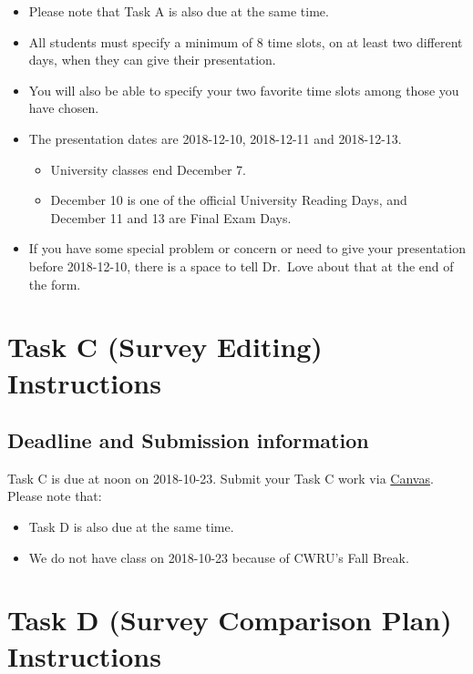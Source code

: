 \documentclass[]{book}
\providecommand{\tightlist}{%
  \setlength{\itemsep}{0pt}\setlength{\parskip}{0pt}}
\theoremstyle{definition}
\theoremstyle{definition}
\theoremstyle{definition}
\theoremstyle{remark}
\begin{document}
\begin{itemize}
\item
  Please note that Task A is also due at the same time.
\item
  All students must specify a minimum of 8 time slots, on at least two
  different days, when they can give their presentation.
\item
  You will also be able to specify your two favorite time slots among
  those you have chosen.
\item
  The presentation dates are 2018-12-10, 2018-12-11 and 2018-12-13.

  \begin{itemize}
  \tightlist
  \item
    University classes end December 7.
  \item
    December 10 is one of the official University Reading Days, and
    December 11 and 13 are Final Exam Days.
  \end{itemize}
\item
  If you have some special problem or concern or need to give your
  presentation before 2018-12-10, there is a space to tell Dr.~Love
  about that at the end of the form.
\end{itemize}

\hypertarget{taskC}{%
\chapter{Task C (Survey Editing) Instructions}\label{taskC}}

\hypertarget{deadline-and-submission-information-2}{%
\section{Deadline and Submission
information}\label{deadline-and-submission-information-2}}

Task C is due at noon on 2018-10-23. Submit your Task C work via
\href{https://canvas.case.edu/}{Canvas}. Please note that:

\begin{itemize}
\tightlist
\item
  Task D is also due at the same time.
\item
  We do not have class on 2018-10-23 because of CWRU's Fall Break.
\end{itemize}

\hypertarget{taskD}{%
\chapter{Task D (Survey Comparison Plan) Instructions}\label{taskD}}
\end{document}
